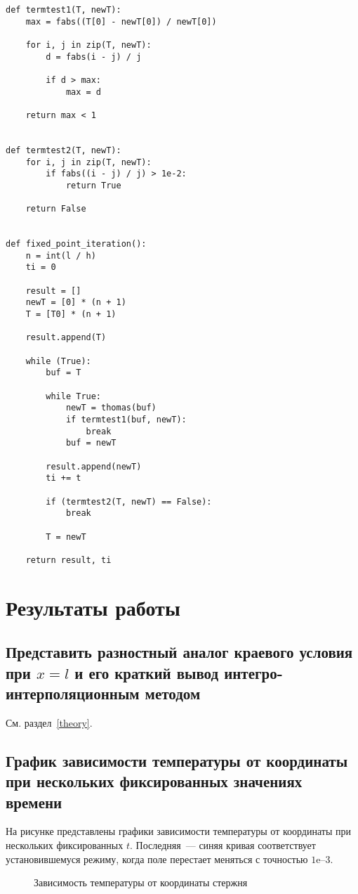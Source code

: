 \begin{lstlisting}[caption={Метод простых итераций}]
def termtest1(T, newT):
    max = fabs((T[0] - newT[0]) / newT[0])

    for i, j in zip(T, newT):
        d = fabs(i - j) / j

        if d > max:
            max = d

    return max < 1


def termtest2(T, newT):
    for i, j in zip(T, newT):
        if fabs((i - j) / j) > 1e-2:
            return True

    return False


def fixed_point_iteration():
    n = int(l / h)
    ti = 0

    result = []
    newT = [0] * (n + 1)
    T = [T0] * (n + 1)

    result.append(T)

    while (True):
        buf = T

        while True:
            newT = thomas(buf)
            if termtest1(buf, newT):
                break
            buf = newT

        result.append(newT)
        ti += t

        if (termtest2(T, newT) == False):
            break

        T = newT

    return result, ti
\end{lstlisting}

\section{Результаты работы}

\subsection{Представить разностный аналог краевого условия при $x = l$ и его краткий вывод интегро-интерполяционным методом}
См. раздел~\ref{theory}.

\subsection{График зависимости температуры от координаты при нескольких фиксированных значениях времени}
На рисунке представлены графики зависимости температуры от координаты при нескольких фиксированных $t$. Последняя~--– синяя кривая соответствует установившемуся режиму, когда поле перестает меняться с точностью $1\text{e--}3$.
\begin{figure}[H]
    \caption{Зависимость температуры от координаты стержня}
    
\end{figure}

